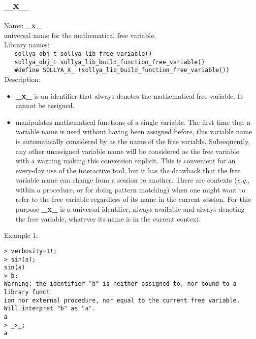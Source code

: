 \subsection{\_x\_}
\label{labxfreevariable}
\noindent Name: \textbf{\_x\_}\\
\phantom{aaa}universal name for the mathematical free variable.\\[0.2cm]
\noindent Library names:\\
\verb|   sollya_obj_t sollya_lib_free_variable()|\\
\verb|   sollya_obj_t sollya_lib_build_function_free_variable()|\\
\verb|   #define SOLLYA_X_ (sollya_lib_build_function_free_variable())|\\[0.2cm]
\noindent Description: \begin{itemize}

\item \textbf{\_x\_} is an identifier that always denotes the mathematical free variable.
   It cannot be assigned.

\item \sollya manipulates mathematical functions of a single variable. The first
   time that a variable name is used without having been assigned before, this
   variable name is automatically considered by \sollya as the name of the
   free variable. Subsequently, any other unassigned variable name will be
   considered as the free variable with a warning making this conversion
   explicit. This is convenient for an every-day use of the interactive tool,
   but it has the drawback that the free variable name can change from a
   session to another. There are contexts (\emph{e.g.}, within a procedure, or for
   doing pattern matching) when one might want to refer to the free variable
   regardless of its name in the current session. For this purpose \textbf{\_x\_} is
   a universal identifier, always available and always denoting the free
   variable, whatever its name is in the current context.
\end{itemize}
\noindent Example 1: 
\begin{center}\begin{minipage}{15cm}\begin{Verbatim}[frame=single]
> verbosity=1!;
> sin(a);
sin(a)
> b;
Warning: the identifier "b" is neither assigned to, nor bound to a library funct
ion nor external procedure, nor equal to the current free variable.
Will interpret "b" as "a".
a
> _x_;
a
\end{Verbatim}
\end{minipage}\end{center}
